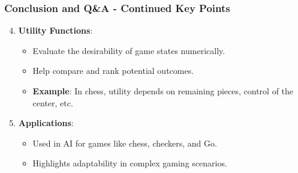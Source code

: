 \documentclass[aspectratio=169]{beamer}
\begin{document}
\begin{frame}[fragile]
    \frametitle{Conclusion and Q\&A - Continued Key Points}
    \begin{enumerate}
        \setcounter{enumi}{3} %
        
        \item \textbf{Utility Functions}:
        \begin{itemize}
            \item Evaluate the desirability of game states numerically.
            \item Help compare and rank potential outcomes.
            \item \textbf{Example}: In chess, utility depends on remaining pieces, control of the center, etc.
        \end{itemize}
        
        \item \textbf{Applications}:
        \begin{itemize}
            \item Used in AI for games like chess, checkers, and Go.
            \item Highlights adaptability in complex gaming scenarios.
        \end{itemize}
    \end{enumerate}
\end{frame}
\end{document}

